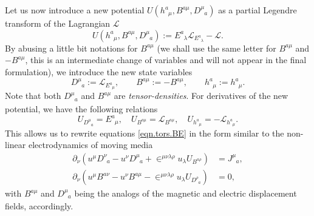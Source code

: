 \documentclass[
10pt, %
a4paper, %
oneside, %
twocolumn,
headinclude,footinclude, %
BCOR5mm, %
]{scrartcl}
\newcommand{\tetrsymbol}{h}
\newcommand{\tetr}[2]{\tetrsymbol^{#1}_{\phantom{#1}#2}}
\newcommand{\D}[1]{\partial_{#1}} %
\newcommand{\ET}[2]{E^{#1}_{\phantom{#1}#2}}	%
\newcommand{\Dm}[2]{D_{\phantom{#2}#1}^{#2}}	%
\newcommand{\BT}[2]{B^{#1#2}}	%
\newcommand{\Bm}[2]{B^{#1#2}}	%
\newcommand{\LagBE}{\mathcal{L}}%
\newcommand{\Um}{U}%
\newcommand{\LCsymb}{\bm{\in}}    %
\newcommand{\NC}[2]{J^{#2}_{\phantom{#2}#1}}
\begin{document}
	Let us now introduce a new potential $ \Um(\tetr{a}{\mu},\Bm{a}{\mu},\Dm{a}{\mu}) $ as a 
	partial 
	Legendre transform of the Lagrangian $ \LagBE $
	\begin{equation}\label{eqn.Legendre1}
		\Um(\tetr{a}{\mu},\Bm{a}{\mu},\Dm{a}{\mu}) := \ET{a}{\lambda}\LagBE_{\ET{a}{\lambda}} - 
		\LagBE.
	\end{equation}
	By abusing a little bit notations for $ \BT{a}{\mu} $ (we shall use the same letter for $ 
	\BT{a}{\mu} $ and $ -\Bm{a}{\mu} $, this is an intermediate change 
	of variables and will not appear in the final formulation), we introduce the new state variables
	\begin{equation}\label{eqn.Legendre2}
		\Dm{a}{\mu} := \LagBE_{\ET{a}{\mu}}, \qquad \Bm{a}{\mu} := -\BT{a}{\mu}, \qquad 
		\tetr{a}{\mu} := \tetr{a}{\mu}.
	\end{equation}
	Note 
	that both $ \Dm{a}{\mu} $ and $ \Bm{a}{\mu} $ are 
	\emph{tensor-densities}. For derivatives of the new potential, we have the following relations
	\begin{equation}\label{eqn.Legendre3}
		\Um_{\Dm{a}{\mu}} = \ET{a}{\mu}, \quad \Um_{\Bm{a}{\mu}} = \LagBE_{\BT{a}{\mu}},
		\quad \Um_{\tetr{a}{\mu}} = - \LagBE_{\tetr{a}{\mu}}.
	\end{equation}
	This allows us to rewrite equations \eqref{eqn.tors.BE} in 
	the form similar to the non-linear 
	electrodynamics of moving media~\cite{Obukhov2008,DPRZ2017,Hohmann2018a}
	\begin{subequations}
		\begin{align}
			\D{\nu}(u^\mu\Dm{a}{\nu} - u^\nu \Dm{a}{\mu} + 
			\LCsymb^{\mu\nu\lambda\rho}u_\lambda 
			\Um_{\Bm{a}{\rho}})
			& =	\NC{a}{\mu},\\[2mm]
			\D{\nu}(u^\mu \Bm{a}{\nu} - u^\nu \Bm{a}{\mu} - 
			\LCsymb^{\mu\nu\lambda\rho}u_\lambda 
			\Um_{\Dm{a}{\rho}}) 
			& = 0,
		\end{align}
	\end{subequations}
	with $\Bm{a}{\mu}$ and $\Dm{a}{\mu}$ being the analogs of the magnetic and
	electric displacement fields, accordingly.
	
\end{document}
